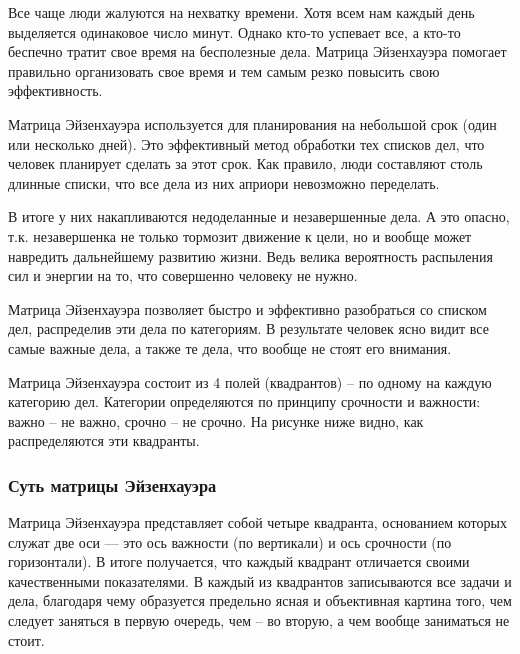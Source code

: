 Все чаще люди жалуются на нехватку времени. Хотя всем нам каждый день выделяется одинаковое число минут. Однако кто-то успевает все, а кто-то беспечно тратит свое время на бесполезные дела. Матрица Эйзенхауэра помогает правильно организовать свое время и тем самым резко повысить свою эффективность.


Матрица Эйзенхауэра используется для планирования на небольшой срок (один или несколько дней). Это эффективный метод обработки тех списков дел, что человек планирует сделать за этот срок. Как правило, люди составляют столь длинные списки, что все дела из них априори невозможно переделать.

В итоге у них накапливаются недоделанные и незавершенные дела. А это опасно, т.к. незавершенка не только тормозит движение к цели, но и вообще может навредить дальнейшему развитию жизни. Ведь велика вероятность распыления сил и энергии на то, что совершенно человеку не нужно.

Матрица Эйзенхауэра позволяет быстро и эффективно разобраться со списком дел, распределив эти дела по категориям. В результате человек ясно видит все самые важные дела, а также те дела, что вообще не стоят его внимания.

Матрица Эйзенхауэра состоит из 4 полей (квадрантов) – по одному на каждую категорию дел. Категории определяются по принципу срочности и важности: важно – не важно, срочно – не срочно. На рисунке ниже видно, как распределяются эти квадранты.

\subsubsection{Суть матрицы Эйзенхауэра }
Матрица Эйзенхауэра представляет собой четыре квадранта, основанием которых служат две оси — это ось важности (по вертикали) и ось срочности (по горизонтали). В итоге получается, что каждый квадрант отличается своими качественными показателями. В каждый из квадрантов записываются все задачи и дела, благодаря чему образуется предельно ясная и объективная картина того, чем следует заняться в первую очередь, чем – во вторую, а чем вообще заниматься не стоит.

